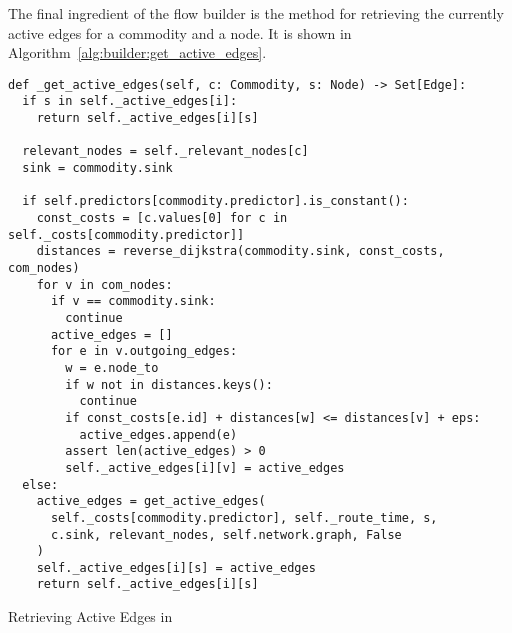 The final ingredient of the flow builder is the method  for retrieving the currently active edges for a commodity and a node.
It is shown in Algorithm~\ref{alg:builder:get_active_edges}.

\begin{algorithm}
  \begin{verbatim}
def _get_active_edges(self, c: Commodity, s: Node) -> Set[Edge]:
  if s in self._active_edges[i]:
    return self._active_edges[i][s]

  relevant_nodes = self._relevant_nodes[c]
  sink = commodity.sink

  if self.predictors[commodity.predictor].is_constant():
    const_costs = [c.values[0] for c in self._costs[commodity.predictor]]
    distances = reverse_dijkstra(commodity.sink, const_costs, com_nodes)
    for v in com_nodes:
      if v == commodity.sink:
        continue
      active_edges = []
      for e in v.outgoing_edges:
        w = e.node_to
        if w not in distances.keys():
          continue
        if const_costs[e.id] + distances[w] <= distances[v] + eps:
          active_edges.append(e)
        assert len(active_edges) > 0
        self._active_edges[i][v] = active_edges
  else:
    active_edges = get_active_edges(
      self._costs[commodity.predictor], self._route_time, s,
      c.sink, relevant_nodes, self.network.graph, False
    )
    self._active_edges[i][s] = active_edges
    return self._active_edges[i][s]
\end{verbatim}
\caption{Retrieving Active Edges in }
\label{alg:builder:get_active_edges}
\end{algorithm}